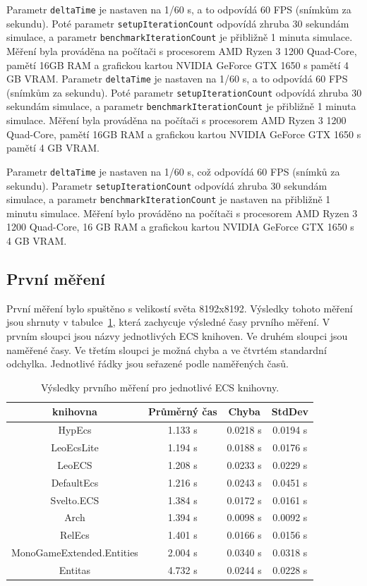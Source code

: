 Parametr \texttt{deltaTime} je nastaven na 1/60 s, a to odpovídá 60 FPS (snímkům za sekundu). Poté parametr \texttt{setupIterationCount} odpovídá zhruba 30 sekundám simulace, a parametr \texttt{benchmarkIterationCount} je přibližně 1 minuta simulace. Měření byla prováděna na počítači s procesorem AMD Ryzen 3 1200 Quad-Core, pamětí 16GB RAM a grafickou kartou NVIDIA GeForce GTX 1650 s pamětí 4 GB VRAM.
Parametr \texttt{deltaTime} je nastaven na 1/60 s, a to odpovídá 60 FPS (snímkům za sekundu). Poté parametr \texttt{setupIterationCount} odpovídá zhruba 30 sekundám simulace, a parametr \texttt{benchmarkIterationCount} je přibližně 1 minuta simulace. Měření byla prováděna na počítači s procesorem AMD Ryzen 3 1200 Quad-Core, pamětí 16GB RAM a grafickou kartou NVIDIA GeForce GTX 1650 s pamětí 4 GB VRAM.

Parametr \texttt{deltaTime} je nastaven na 1/60 s, což odpovídá 60 FPS (snímků za sekundu). Parametr \texttt{setupIterationCount} odpovídá zhruba 30 sekundám simulace, a parametr \texttt{benchmarkIterationCount} je nastaven na přibližně 1 minutu simulace. Měření bylo prováděno na počítači s procesorem AMD Ryzen 3 1200 Quad-Core, 16 GB RAM a grafickou kartou NVIDIA GeForce GTX 1650 s 4 GB VRAM.

\subsection{První měření}
První měření bylo spuštěno s velikostí světa 8192x8192. Výsledky tohoto měření jsou shrnuty v tabulce~\ref{tab:first-benchmark-results}, která zachycuje výsledné časy prvního měření. V prvním sloupci jsou názvy jednotlivých ECS knihoven. Ve druhém sloupci jsou naměřené časy. Ve třetím sloupci je možná chyba a ve čtvrtém standardní odchylka. Jednotlivé řádky jsou seřazené podle naměřených časů.

\begin{table}[!htb]
    \centering\footnotesize\sf
    \begin{tabular}{c c c c}
        \toprule
        knihovna & Průměrný čas & Chyba & StdDev \\
        \midrule
        HypEcs & 1.133 s & 0.0218 s & 0.0194 s \\
        LeoEcsLite & 1.194 s & 0.0188 s & 0.0176 s \\
        LeoECS & 1.208 s & 0.0233 s & 0.0229 s \\
        DefaultEcs & 1.216 s & 0.0243 s & 0.0451 s \\
        Svelto.ECS & 1.384 s & 0.0172 s & 0.0161 s \\
        Arch & 1.394 s & 0.0098 s & 0.0092 s \\
        RelEcs & 1.401 s & 0.0166 s & 0.0156 s \\
        MonoGameExtended.Entities & 2.004 s & 0.0340 s & 0.0318 s \\
        Entitas & 4.732 s & 0.0244 s & 0.0228 s \\
        \bottomrule
    \end{tabular}
    \caption{Výsledky prvního měření pro jednotlivé ECS knihovny.}
    \label{tab:first-benchmark-results}
\end{table}

